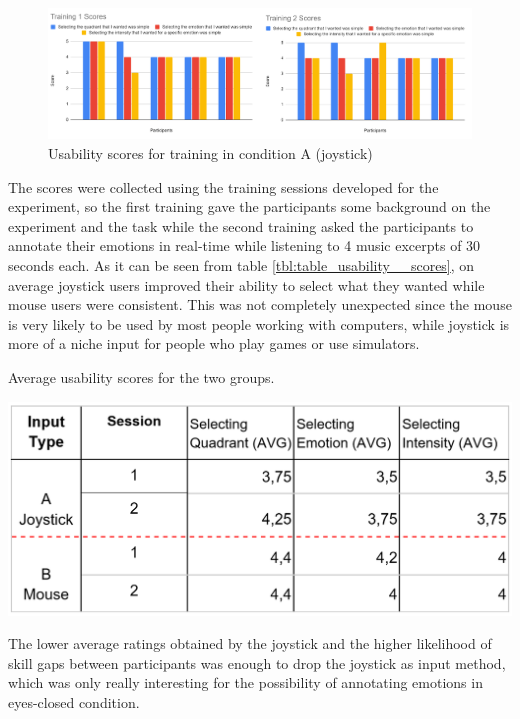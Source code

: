\begin{figure}[!htb]
\includegraphics[width=16cm]{img/appendix/usability_condition_B.png}
\centering
\caption{Usability scores for training in condition A (joystick)}\label{fig:usability_condition_B}
\end{figure}
The scores were collected using the training sessions developed for the experiment, so the first training gave the participants some background on the experiment and the task while the second training asked the participants to annotate their emotions in real-time while listening to 4 music excerpts of 30 seconds each. As it can be seen from table \ref{tbl:table_usability__scores}, on average joystick users improved their ability to select what they wanted while mouse users were consistent. This was not completely unexpected since the mouse is very likely to be used by most people working with computers, while joystick is more of a niche input for people who play games or use simulators.

\begin{table}[!htb]
  \caption{Average usability scores for the two groups.}
  \label{tbl:table_usability__scores}
  \includegraphics[width=\linewidth]{img/appendix/table_usability_scores.png}
\end{table}
The lower average ratings obtained by the joystick and the higher likelihood of skill gaps between participants was enough to drop the joystick as input method, which was only really interesting for the possibility of annotating emotions in eyes-closed condition.

